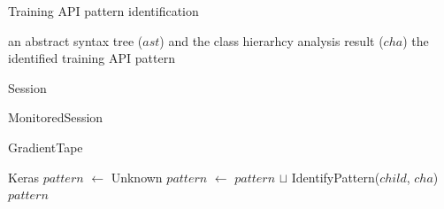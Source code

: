 \begin{algorithm}[t]
  \caption{Training API pattern identification}\label{al:apiident}
  \begin{algorithmic}[1]
    \Require an abstract syntax tree ($ast$) and the class hierarhcy analysis result ($cha$)
    \Ensure the identified training API pattern

      \label{alg:begin-match-session}
          Session
        \EndIf
      \Endcase\label{alg:end-match-session}

      \label{alg:begin-match-monitoredsession}
          MonitoredSession
        \EndIf
      \Endcase\label{alg:end-match-monitoredsession}

      \label{alg:begin-match-gradient}
        \label{alg:mid-match-gradient}
          GradientTape
        \EndIf
      \EndCase\label{alg:end-match-gradient}

      \label{alg:begin-match-keras}
          Keras
        \EndIf
      \Endcase\label{alg:end-match-keras}
      \Other
        \State $pattern$ $\leftarrow$ Unknown\label{alg:begin-ow}
          \State $pattern$ $\leftarrow$ $pattern$ $\sqcup$ {\sc IdentifyPattern($child$, $cha$)}
        \Endforeach
        \State $pattern$\label{alg:end-ow}
      \Endother
    \Endmatch
    \EndFunction
  \end{algorithmic}
\end{algorithm}

